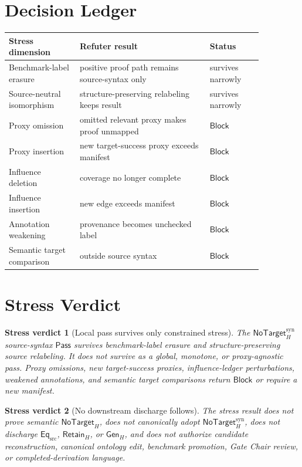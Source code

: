 \documentclass[11pt]{article}
\newcommand{\GenH}{\mathsf{Gen}_{H}}
\newcommand{\EqSrc}{\mathsf{Eq}_{\mathrm{src}}}
\newcommand{\RetainH}{\mathsf{Retain}_{H}}
\newcommand{\NoTargetH}{\mathsf{NoTarget}_{H}}
\newcommand{\NoTargetSyn}{\mathsf{NoTarget}_{H}^{\mathrm{syn}}}
\newcommand{\Pass}{\mathsf{Pass}}
\newcommand{\Block}{\mathsf{Block}}
\newtheorem{verdict}{Stress verdict}
\begin{document}
\section{Decision Ledger}

\begin{center}
\begin{tabular}{p{0.24\linewidth}p{0.44\linewidth}p{0.18\linewidth}}
\textbf{Stress dimension} & \textbf{Refuter result} & \textbf{Status} \\
\hline
Benchmark-label erasure & positive proof path remains source-syntax only & survives narrowly \\
Source-neutral isomorphism & structure-preserving relabeling keeps result & survives narrowly \\
Proxy omission & omitted relevant proxy makes proof unmapped & \(\Block\) \\
Proxy insertion & new target-success proxy exceeds manifest & \(\Block\) \\
Influence deletion & coverage no longer complete & \(\Block\) \\
Influence insertion & new edge exceeds manifest & \(\Block\) \\
Annotation weakening & provenance becomes unchecked label & \(\Block\) \\
Semantic target comparison & outside source syntax & \(\Block\) \\
\end{tabular}
\end{center}

\section{Stress Verdict}

\begin{verdict}[Local pass survives only constrained stress]
The \(\NoTargetSyn\) source-syntax \(\Pass\) survives benchmark-label
erasure and structure-preserving source relabeling. It does not survive as
a global, monotone, or proxy-agnostic pass. Proxy omissions, new
target-success proxies, influence-ledger perturbations, weakened
annotations, and semantic target comparisons return \(\Block\) or require
a new manifest.
\end{verdict}

\begin{verdict}[No downstream discharge follows]
The stress result does not prove semantic \(\NoTargetH\), does not
canonically adopt \(\NoTargetSyn\), does not discharge \(\EqSrc\),
\(\RetainH\), or \(\GenH\), and does not authorize candidate
reconstruction, canonical ontology edit, benchmark promotion, Gate Chair
review, or completed-derivation language.
\end{verdict}
\end{document}
